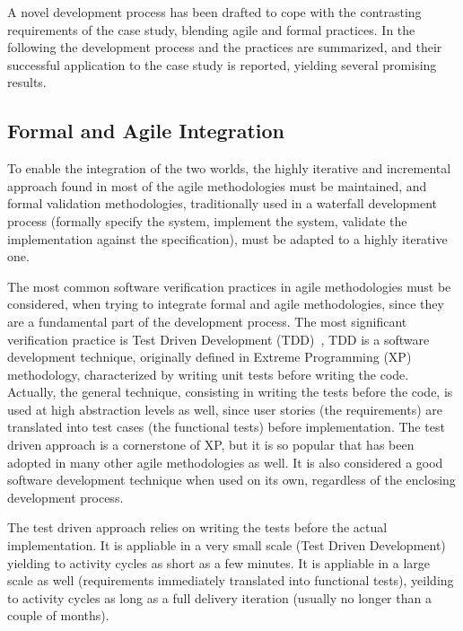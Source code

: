 \documentclass[english]{lni}
\begin{document}
A novel development process has been drafted to cope with the contrasting requirements of the case study, blending agile and formal practices.  
In the following the development process and the practices are summarized, and their successful application to the case study is reported, yielding several promising results.



\subsection{Formal and Agile Integration}
\label{subsec:formal_and_agile_integration}

To enable the integration of the two worlds, the highly iterative and incremental approach found in most of the agile methodologies must be maintained, and formal validation  methodologies, traditionally used in a waterfall development process (formally specify the system, implement the system, validate the implementation against the specification), must be adapted to a highly iterative one.

The most common software verification practices in agile methodologies must be considered, when trying to integrate formal and agile methodologies, since they are a fundamental part of the development process. 
The most significant verification practice is Test Driven Development (TDD)~\cite{Beck2003}, TDD is a software development technique, originally defined in Extreme Programming (XP)~\cite{Beck2004} methodology, characterized by writing unit tests before writing the code.
Actually, the general technique, consisting in writing the tests before the code, is used at high abstraction levels as well, since user stories (the requirements) are translated into test cases (the functional tests) before implementation.
The test driven approach is a cornerstone of XP, but it is so popular that has been adopted in many other agile methodologies as well.
It is also considered a good software development technique when used on its own, regardless of the enclosing development process.

The test driven approach relies on writing the tests before the actual implementation. 
It is appliable in a very small scale (Test Driven Development) yielding to activity cycles as short as a few minutes.
It is appliable in a large scale as well (requirements immediately translated into functional tests), yeilding to activity cycles as long as a full delivery iteration (usually no longer than a couple of months).
\end{document}
